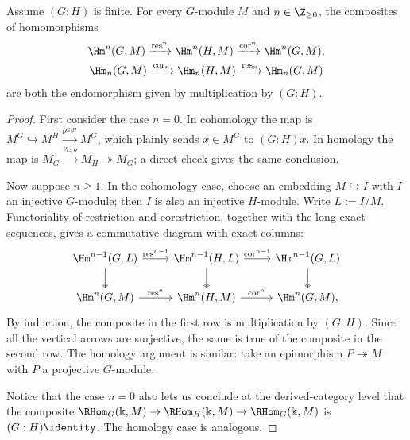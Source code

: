 \begin{proposition}\label{prop:res-cor}
	Assume $(G:H)$ is finite. For every $G$-module $M$ and
	$n\in\Z_{\geq0}$, the composites of homomorphisms
	\begin{gather*}
		\Hm^n(G, M) \xrightarrow{\mathrm{res}^n} \Hm^n(H, M) \xrightarrow{\mathrm{cor}^n} \Hm^n(G, M), \\
		\Hm_n(G, M) \xrightarrow{\mathrm{cor}_n} \Hm_n(H, M) \xrightarrow{\mathrm{res}_n} \Hm_n(G, M)
	\end{gather*}
	are both the endomorphism given by multiplication by $(G:H)$.
\end{proposition}
\begin{proof}
	First consider the case $n=0$. In cohomology the map is
	$M^G\hookrightarrow M^H\xrightarrow{\nu^{G|H}}M^G$, which plainly sends
	$x\in M^G$ to $(G:H)x$. In homology the map is
	$M_G\xrightarrow{\nu_{G|H}}M_H\twoheadrightarrow M_G$; a direct check
	gives the same conclusion.

	Now suppose $n\geq1$. In the cohomology case, choose an embedding
	$M\hookrightarrow I$ with $I$ an injective $G$-module; then $I$ is also
	an injective $H$-module. Write $L:=I/M$. Functoriality of restriction and
	corestriction, together with the long exact sequences, gives a commutative
	diagram with exact columns:
	\[\begin{tikzcd}
		\Hm^{n-1}(G, L) \arrow[r, "{\mathrm{res}^{n-1}}"] \arrow[twoheadrightarrow, d] & \Hm^{n-1}(H, L) \arrow[r, "{\mathrm{cor}^{n-1}}"] \arrow[twoheadrightarrow, d] & \Hm^{n-1}(G, L) \arrow[twoheadrightarrow, d] \\
		\Hm^n(G, M) \arrow[r, "{\mathrm{res}^n}"] & \Hm^n(H, M) \arrow[r, "{\mathrm{cor}^n}"] & \Hm^n(G, M),
	\end{tikzcd}\]
	By induction, the composite in the first row is multiplication by
	$(G:H)$. Since all the vertical arrows are surjective, the same is true
	of the composite in the second row. The homology argument is similar:
	take an epimorphism $P\twoheadrightarrow M$ with $P$ a projective
	$G$-module.

	Notice that the case $n=0$ also lets us conclude at the derived-category
	level that the composite
	$\RHom_G(\Bbbk,M)\to\RHom_H(\Bbbk,M)\to\RHom_G(\Bbbk,M)$ is
	$(G:H)\identity$. The homology case is analogous.
\end{proof}

